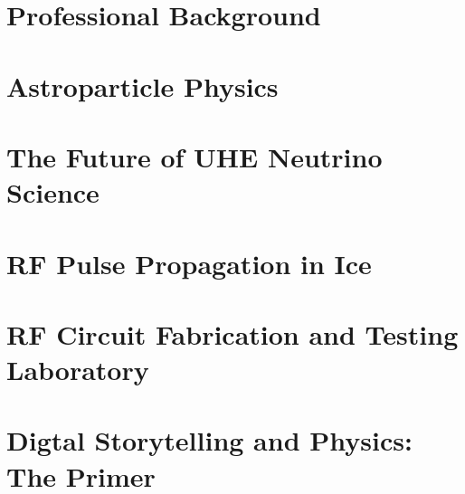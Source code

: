\documentclass[../main.tex]{subfiles}
\begin{document}
\section{Professional Background}

\begin{flushleft}

\end{flushleft}

\section{Astroparticle Physics}

\begin{flushleft}

\end{flushleft}

\section{The Future of UHE Neutrino Science}

\begin{flushleft}

\end{flushleft}

\section{RF Pulse Propagation in Ice}

\begin{flushleft}

\end{flushleft}

\section{RF Circuit Fabrication and Testing Laboratory}

\begin{flushleft}

\end{flushleft}

\section{Digtal Storytelling and Physics: The Primer}

\begin{flushleft}

\end{flushleft}

\begin{flushleft}

\end{flushleft}
\end{document}
